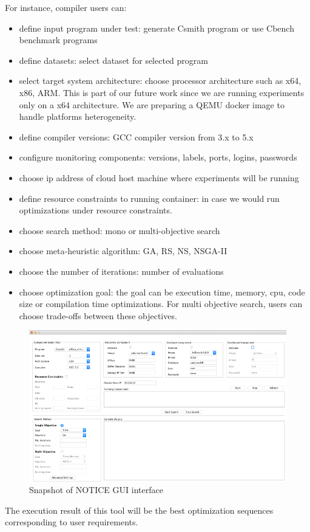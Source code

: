 For instance, compiler users can:
\begin{itemize} 
	

\item define input program under test: generate Csmith program or use Cbench benchmark programs
\item define datasets: select dataset for selected program
\item select target system architecture: choose processor architecture such as x64, x86, ARM. This is part of our future work since we are running experiments only on a x64 architecture. We are preparing a QEMU docker image to handle platforms heterogeneity.
\item define compiler versions: GCC compiler version from 3.x to 5.x
\item configure monitoring components: versions, labels, ports, logins, passwords
\item choose ip address of cloud host machine where experiments will be running
\item define resource constraints to running container: in case we would run optimizations under resource constraints.
\item choose search method: mono or multi-objective search
\item choose meta-heuristic algorithm: GA, RS, NS, NSGA-II
\item choose the number of iterations: number of evaluations
\item choose optimization goal: the goal can be execution time, memory, cpu, code size or compilation time optimizations. For multi objective search, users can choose trade-offs between these objectives.
\end{itemize} 
\begin{figure}[h]
	\center
	\includegraphics[scale=0.65]{chapitre3/fig/tool_support}
	\caption{Snapshot of NOTICE GUI interface}
	\label{fig:tool_support}
\end{figure}
The execution result of this tool will be the best optimization sequences corresponding to user requirements.
		
